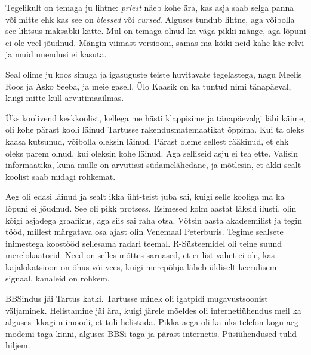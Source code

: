 Tegelikult on temaga ju lihtne: \emph{priest} näeb kohe ära, kas asja 
saab selga panna või mitte ehk kas see on \emph{blessed} või \emph{cursed}. 
Alguses tundub lihtne, aga võibolla see lihtsus maksabki kätte. Mul on 
temaga olnud ka väga pikki mänge, aga lõpuni ei ole veel jõudnud. Mängin 
viimast versiooni, samas ma kõiki neid kahe käe relvi ja muid 
uuendusi ei kasuta.


Seal olime ju koos sinuga ja igasuguste teiste huvitavate tegelastega, nagu Meelis 
Roos ja Asko Seeba, ja meie 
gasell. Ülo 
Kaasik on ka tuntud nimi tänapäeval, kuigi mitte küll 
arvutimaailmas.


Üks koolivend keskkoolist, kellega me hästi klappisime ja tänapäevalgi läbi 
käime, oli kohe pärast kooli läinud Tartusse rakendusmatemaatikat õppima. Kui ta oleks 
kaasa kutsunud, võibolla oleksin läinud. Pärast oleme sellest 
rääkinud, et ehk oleks parem olnud, kui oleksin kohe läinud. 
Aga selliseid asju ei tea ette. Valisin informaatika, kuna mulle on arvutiasi 
südamelähedane, ja mõtlesin, et äkki sealt koolist saab midagi rohkemat. 


Aeg oli edasi läinud ja sealt ikka üht-teist juba sai, kuigi selle 
kooliga ma ka lõpuni ei jõudnud. See oli pikk protsess. Esimesed kolm aastat 
läksid ilusti, olin kõigi asjadega graafikus, aga siis sai raha otsa. Võtsin 
aasta akadeemilist ja tegin tööd, millest märgatava osa ajast olin 
Venemaal Peterburis. Tegime sealsete inimestega koostööd sellesama radari 
teemal. R-Süsteemidel oli teine suund merelokaatorid. Need on selles 
mõttes sarnased, et erilist vahet ei ole, kas kajalokatsioon on õhus või vees, kuigi merepõhja läheb üldiselt keerulisem signaal, kanaleid 
on rohkem.


BBSindus jäi Tartus katki. Tartusse minek oli igatpidi
mugavustsoonist väljaminek. Helistamine jäi ära, kuigi järele 
mõeldes oli internetiühendus meil ka alguses ikkagi niimoodi, et tuli 
helistada. Pikka aega oli ka üks telefon kogu aeg modemi 
taga kinni, alguses BBSi taga ja pärast internetis. Püsiühendused tulid 
hiljem.

